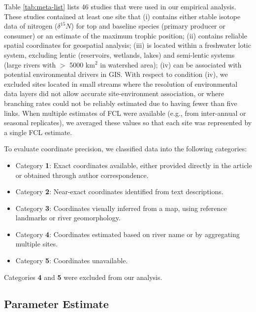\documentclass[11pt, class=article, crop=false]{standalone}
\theoremstyle{definition}
\begin{document}
Table \ref{tab:meta-list} lists 46 studies that were used in our empirical analysis.
These studies contained at least one site that (i) contains either stable isotope data of nitrogen ($\delta^{15}N$) for top and baseline species (primary producer or consumer) or an estimate of the maximum trophic position; (ii) contains reliable spatial coordinates for geospatial analysis; (iii) is located within a freshwater lotic system, excluding lentic (reservoirs, wetlands, lakes) and semi-lentic systems (large rivers with $>$ 5000 km$^2$ in watershed area); (iv) can be associated with potential environmental drivers in GIS.
With respect to condition (iv), we excluded sites located in small streams where the resolution of environmental data layers did not allow accurate site-environment association, or where branching rates could not be reliably estimated due to having fewer than five links.
When multiple estimates of FCL were available (e.g., from inter-annual or seasonal replicates), we averaged these values so that each site was represented by a single FCL estimate.

To evaluate coordinate precision, we classified data into the following categories:

\begin{itemize}
    \item Category \textbf{1}: Exact coordinates available, either provided directly in the article or obtained through author correspondence.
    \item Category \textbf{2}: Near-exact coordinates identified from text descriptions.
    \item Category \textbf{3}: Coordinates visually inferred from a map, using reference landmarks or river geomorphology.
    \item Category \textbf{4}: Coordinates estimated based on river name or by aggregating multiple sites.
    \item Category \textbf{5}: Coordinates unavailable.
\end{itemize}

Categories \textbf{4} and \textbf{5} were excluded from our analysis.

\vspace{0.5cm} 

\vspace{0.5cm} 

\subsection{Parameter Estimate}
\end{document}
